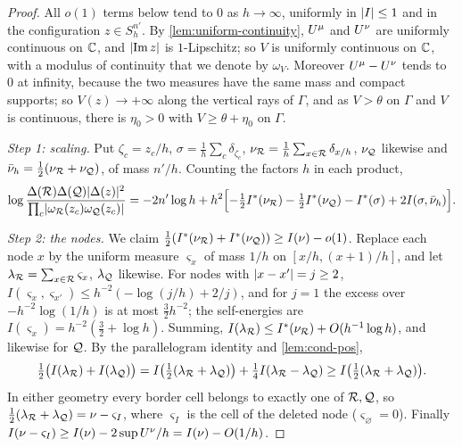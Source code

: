 \begin{proof}
All $o(1)$ terms below tend to $0$ as $h\to\infty$, uniformly in $\lvert I\rvert\le1$ and in the
configuration $z\in S_h^{n'}$. By \cref{lem:uniform-continuity}, $U^{\mu}$ and $U^{\nu}$ are
uniformly continuous on $\mathbb{C}$, and $\lvert \operatorname{Im}z\rvert$ is $1$-Lipschitz; so $V$ is uniformly
continuous on $\mathbb{C}$, with a modulus of continuity that we denote by $\omega_V$. Moreover
$U^{\mu}-U^{\nu}$ tends to $0$ at infinity, because the two measures have the same mass and
compact supports; so $V(z)\to+\infty$ along the vertical rays of $\Gamma$, and as $V>\theta$ on
$\Gamma$ and $V$ is continuous, there is $\eta_0>0$ with $V\ge\theta+\eta_0$ on $\Gamma$.

\emph{Step 1: scaling.} Put $\zeta_c=z_c/h$, $\sigma=\frac1h\sum_c\delta_{\zeta_c}$,
$\nu_{\mathcal{R}}=\frac1h\sum_{x\in\mathcal{R}}\delta_{x/h}$, $\nu_{\mathcal{Q}}$ likewise and
$\bar\nu_h=\frac12(\nu_{\mathcal{R}}+\nu_{\mathcal{Q}})$, of mass $n'/h$. Counting the factors $h$ in each product,
\begin{equation}\label{eq:scaled-integrand}
  \log\frac{\Delta(\mathcal{R})\Delta(\mathcal{Q})\lvert \Delta(z)\rvert^2}{\prod_c\lvert \omega_{\mathcal{R}}(z_c)\omega_{\mathcal{Q}}(z_c)\rvert}
  =-2n'\log h+h^2\Bigl[-\tfrac12I^*(\nu_{\mathcal{R}})-\tfrac12I^*(\nu_{\mathcal{Q}})-I^*(\sigma)
  +2I(\sigma,\bar\nu_h)\Bigr].
\end{equation}

\emph{Step 2: the nodes.} We claim $\frac12(I^*(\nu_{\mathcal{R}})+I^*(\nu_{\mathcal{Q}}))\ge I(\nu)-o(1)$. Replace each
node $x$ by the uniform measure $\varsigma_x$ of mass $1/h$ on $[x/h,(x+1)/h]$, and let
$\lambda_{\mathcal{R}}=\sum_{x\in\mathcal{R}}\varsigma_x$, $\lambda_{\mathcal{Q}}$ likewise. For nodes with $\lvert x-x'\rvert=j\ge2$,
$I(\varsigma_x,\varsigma_{x'})\le h^{-2}(-\log(j/h)+2/j)$, and for $j=1$ the excess over
$-h^{-2}\log(1/h)$ is at most $\frac32h^{-2}$; the self-energies are
$I(\varsigma_x)=h^{-2}(\frac32+\log h)$. Summing,
$I(\lambda_{\mathcal{R}})\le I^*(\nu_{\mathcal{R}})+O(h^{-1}\log h)$, and likewise for $\mathcal{Q}$. By the parallelogram
identity and \cref{lem:cond-pos},
\[
  \tfrac12\bigl(I(\lambda_{\mathcal{R}})+I(\lambda_{\mathcal{Q}})\bigr)
  =I\bigl(\tfrac12(\lambda_{\mathcal{R}}+\lambda_{\mathcal{Q}})\bigr)+\tfrac14I(\lambda_{\mathcal{R}}-\lambda_{\mathcal{Q}})
  \ge I\bigl(\tfrac12(\lambda_{\mathcal{R}}+\lambda_{\mathcal{Q}})\bigr).
\]
In either geometry every border cell belongs to exactly one of $\mathcal{R},\mathcal{Q}$, so
$\frac12(\lambda_{\mathcal{R}}+\lambda_{\mathcal{Q}})=\nu-\varsigma_I$, where $\varsigma_I$ is the cell of the deleted
node ($\varsigma_\varnothing=0$). Finally $I(\nu-\varsigma_I)\ge I(\nu)-2\sup U^{\nu}/h=I(\nu)-O(1/h)$.


\end{proof}
